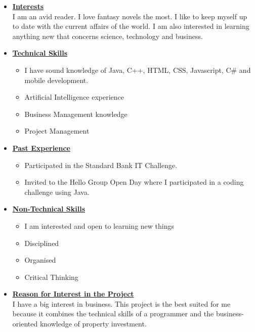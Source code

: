\documentclass[a4paper,12pt]{article}
\begin{document}
\begin{itemize}
\item {\large \underline{\textbf{Interests}}}\\[0.2cm]
I am an avid reader. I love fantasy novels the most. I like to keep myself up to date with the current affairs of the world. I am also interested in learning anything new that concerns science, technology and business.
\\
\item {\large \underline{\textbf{Technical Skills}}}
	\begin{itemize}
		\item I have sound knowledge of Java, C++, HTML, CSS, Javascript, C\# and mobile development. 
		\item Artificial Intelligence experience
		\item Business Management knowledge
		\item Project Management
	\end{itemize}
\bigskip
\item {\large \underline{\textbf{Past Experience}}}
\begin{itemize}
\item Participated in the Standard Bank IT Challenge.
\item Invited to the Hello Group Open Day where I participated in a coding challenge using Java.
\end{itemize}
\bigskip
\item {\large \underline{\textbf{Non-Technical Skills}}}
\begin{itemize}
\item I am interested and open to learning new things
\item Disciplined
\item Organised
\item Critical Thinking
\end{itemize}
\bigskip
\item {\large \underline{\textbf{Reason for Interest in the Project}}}\\[0.2cm]
I have a big interest in business. This project is the best suited for me because it combines the technical skills of a programmer and the business-oriented knowledge of property investment.

\newpage
\end{itemize}
\end{document}
